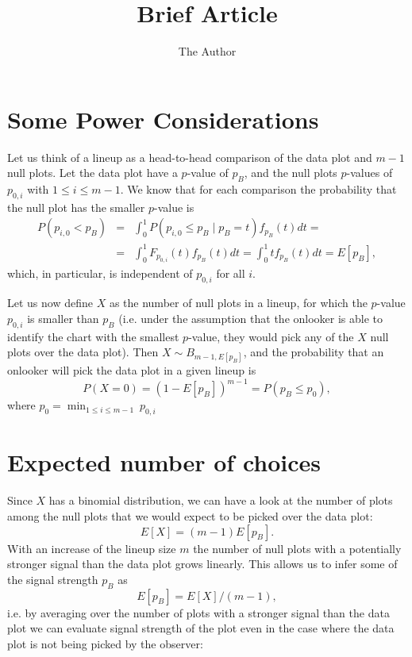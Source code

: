 \documentclass[11pt]{article}
\title{Brief Article}
\author{The Author}
\begin{document}
\section{Some Power Considerations}

Let us think of a lineup as a head-to-head comparison of the data plot and $m-1$ null plots. Let the data plot have a $p$-value of $p_B$, and the null plots $p$-values of $p_{0, i}$ with $1 \le i \le m-1$.
We know that for each comparison the probability that the null plot has the smaller $p$-value is 
\begin{eqnarray*}
P(p_{i,0} < p_B) &=& \int_0^1  P(p_{i,0} \le p_B \mid p_B=t) f_{p_B}(t) dt =  \\
&=& \int_0^1 F_{p_{0,i}}(t) f_{p_B}(t) dt =  \int_0^1 t f_{p_B}(t) dt =  E[p_B],
\end{eqnarray*}
which, in particular, is independent of $p_{0,i}$ for all $i$.

Let us now define $X$ as the number of null plots in a lineup, for which the $p$-value $p_{0,i}$ is smaller than $p_B$ (i.e. under the assumption that the onlooker is able to identify the chart with the smallest $p$-value, they would pick any of the $X$  null plots over the data plot). 
Then $X \sim B_{m-1, E[p_B]}$, and the probability that an onlooker will pick the data plot in a given lineup is 
\begin{equation}\label{p0}
P(X=0) = \left(1 - E[p_B] \right)^{m-1} = P(p_B \le p_0),
\end{equation}
where $p_0 = \min_{1 \le i \le m-1}  \ p_{0,i}$

\section{Expected number of choices}
Since $X$ has a binomial distribution, we can have a look at the number of plots among the null plots that we would expect to be picked over the data plot:
\[
E[X] = (m-1)E[p_B].
\]
With an increase of the lineup size $m$ the number of null plots with a potentially stronger signal than the data plot grows linearly.
This allows us to infer some of the signal strength $p_B$ as
\[
E[p_B] = E[X]/(m-1),
\]
i.e. by averaging over the number of plots with  a stronger signal than the data plot we can evaluate signal strength of the plot even in the case where the data plot is not being picked by the observer:
\end{document}
